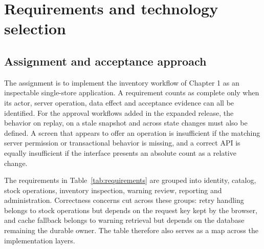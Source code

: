 \chapter{Requirements and technology selection}

\FloatBarrier

\section{Assignment and acceptance approach}

The assignment is to implement the inventory workflow of Chapter 1 as an inspectable single-store application. A requirement counts as complete only when its actor, server operation, data effect and acceptance evidence can all be identified. For the approval workflows added in the expanded release, the behavior on replay, on a stale snapshot and across state changes must also be defined. A screen that appears to offer an operation is insufficient if the matching server permission or transactional behavior is missing, and a correct API is equally insufficient if the interface presents an absolute count as a relative change.


The requirements in Table~\ref{tab:requirements} are grouped into identity, catalog, stock operations, inventory inspection, warning review, reporting and administration. Correctness concerns cut across these groups: retry handling belongs to stock operations but depends on the request key kept by the browser, and cache fallback belongs to warning retrieval but depends on the database remaining the durable owner. The table therefore also serves as a map across the implementation layers.


